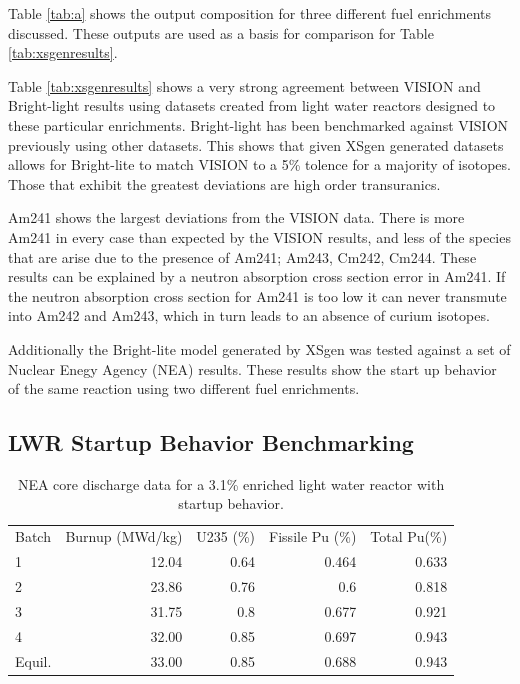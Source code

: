 \documentclass{article}
\begin{document}
Table \ref{tab:a} shows the output composition for three different fuel enrichments discussed. These outputs are used as a basis for comparison for Table \ref{tab:xsgenresults}.

Table \ref{tab:xsgenresults} shows a very strong agreement between VISION and Bright-light results using datasets created from light water reactors designed to these particular enrichments. Bright-light has been benchmarked against VISION previously using other datasets. This shows that given XSgen generated datasets allows for Bright-lite to match VISION to a 5\% tolence for a majority of isotopes. Those that exhibit the greatest deviations are high order transuranics.

Am241 shows the largest deviations from the VISION data. There is more Am241 in every case than expected by the VISION results, and less of the species that are arise due to the presence of Am241; Am243, Cm242, Cm244. These results can be explained by a neutron absorption cross section error in Am241. If the neutron absorption cross section for Am241 is too low it can never transmute into Am242 and Am243, which in turn leads to an absence of curium isotopes.

Additionally the Bright-lite model generated by XSgen was tested against a set of Nuclear Enegy Agency (NEA) results\cite{nea}. These results show the start up behavior of the same reaction using two different fuel enrichments. 

\subsection{LWR Startup Behavior Benchmarking}
\begin{table}[!htb]
\centering
\caption{NEA core discharge data for a 3.1\% enriched light water reactor with startup behavior.}
\label{tab:b}
\begin{tabular}{lrrrr}
Batch & Burnup (MWd/kg) & U235 (\%) & Fissile Pu (\%) & Total Pu(\%) \\
1 & 12.04 & 0.64 & 0.464 & 0.633 \\
2 & 23.86 & 0.76 & 0.6 & 0.818 \\
3 & 31.75 & 0.8 & 0.677 & 0.921 \\
4 & 32.00 & 0.85 & 0.697 & 0.943 \\
Equil. & 33.00 & 0.85 & 0.688 & 0.943
\end{tabular}
\end{table}
\end{document}

